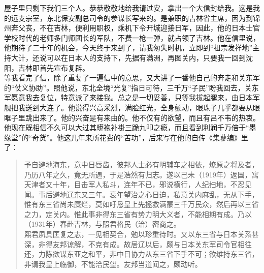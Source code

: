屋子里只剩下我们三个人。恭恭敬敬地给我请过安，拿出一个大信封给我。这是我的远支宗室，东北保安副总司令的参谋长写来的。是兼职的吉林省主席，因为到锦州奔父丧，不在吉林，便利用职权，乘机下令开城迎接日军，因此，他的日本士官学校时代的老师多门师团长的军队，不费一枪一弹，就占领了吉林。他在信里说，他期待了二十年的机会，今天终于来到了，请我匆失时机，立即到“祖宗发祥地”主持大计，还说可以在日本人的支持下，先据有满洲，再图关内，只要我一回到沈阳，吉林即首先宣布复辟。\\

等我看完了信，除了重复了一遍信中的意思，又大讲了一番他自己的奔走和关东军的“仗义协助”。照他说，东北全境“光复”指日可待，三千万“子民”盼我回去，关东军愿意我去复位，特意派了来接我。总之是一切妥善，只等我拔起腿来，由日本军舰把我送到大连了。他说得兴高采烈，满脸红光，全身颤动，眼珠子几乎都要从眼眶子里跳出来了。他的兴奋是有来由的。他不仅有的欲望，而且有吕不韦的热衷。他现在既相信不久可以大过其蟒袍补褂三跪九叩之瘾，而且看到利润千万倍于“墨缘堂”的“奇货”。他这几年来所花费的“苦功”，后来写在他的自传《集蓼编》里了：\\

\begin{quote}
	予自避地海东，意中日唇齿，彼邦人士必有明辅车之相依，燎原之将及者，乃历八年之久，竟无所遇，于是浩然有归志。遂以己未（1919年）返国，寓天津者又十年，目击军人私斗，连年不已，邪说横行，人纪扫地，不忍见闻。事后避地辽东又三年。衰年望治之心日迫，私意关内麻乱，无从下手，惟有东三省尚未糜烂，莫如吁恳皇上先拯救满蒙三千万民众，然后再以三省之力，定关内。惟此事非得东三省有势力明大义者，不能相期有成。乃以（1931年）春赴吉林，与照君格民（洽）密商之。\\

熙君夙具匡复之志，一见相契合，勉以珍重待时。又以东三省与日本关系甚深，非得友邦谅解，不克有成。故居辽以后，颇与日本关东军司令官相往还，力陈欲谋东亚之和平，非中日协力从东三省下手不可；欲维持东三省，非请我皇上临御，不能洽民望。友邦当道闻之，颇动听。\\
\end{quote}

